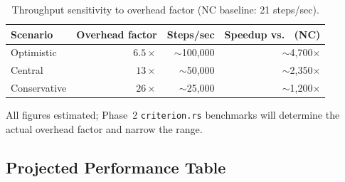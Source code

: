 \begin{table}[h]
\centering
\caption{Throughput sensitivity to overhead factor (NC baseline: 21 steps/sec).}
\label{tab:overhead}
\begin{tabular}{lrrr}
\toprule
Scenario & Overhead factor & Steps/sec & Speedup vs.\ \gc{} (NC) \\
\midrule
Optimistic  & $6.5\times$  & $\sim$100{,}000 & $\sim$4{,}700$\times$ \\
Central     & $13\times$   & $\sim$50{,}000  & $\sim$2{,}350$\times$ \\
Conservative & $26\times$  & $\sim$25{,}000  & $\sim$1{,}200$\times$ \\
\bottomrule
\end{tabular}
\par\vspace{0.5ex}
\small All figures estimated; Phase~2 \texttt{criterion.rs} benchmarks will determine the
actual overhead factor and narrow the range.
\end{table}

\subsection{Projected Performance Table}


